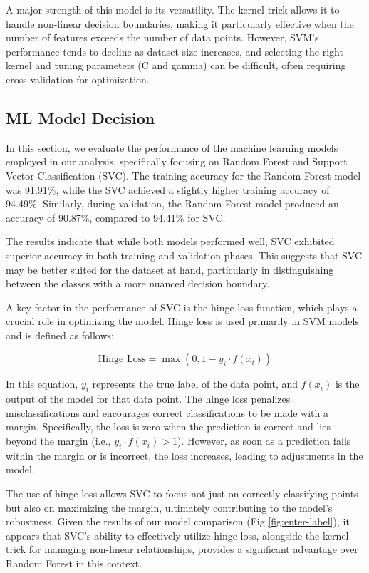 \documentclass{article}
\begin{document}
A major strength of this model is its versatility. The kernel trick allows it to handle non-linear decision boundaries, making it particularly effective when the number of features exceeds the number of data points. However, SVM's performance tends to decline as dataset size increases, and selecting the right kernel and tuning parameters (C and gamma) can be difficult, often requiring cross-validation for optimization.

\subsection{ML Model Decision}

In this section, we evaluate the performance of the machine learning models employed in our analysis, specifically focusing on Random Forest and Support Vector Classification (SVC). The training accuracy for the Random Forest model was 91.91\%, while the SVC achieved a slightly higher training accuracy of 94.49\%. Similarly, during validation, the Random Forest model produced an accuracy of 90.87\%, compared to 94.41\% for SVC. 

The results indicate that while both models performed well, SVC exhibited superior accuracy in both training and validation phases. This suggests that SVC may be better suited for the dataset at hand, particularly in distinguishing between the classes with a more nuanced decision boundary.

A key factor in the performance of SVC is the hinge loss function, which plays a crucial role in optimizing the model. Hinge loss is used primarily in SVM models and is defined as follows\cite{Hinge-loss}:

\[
\text{Hinge Loss} = \max(0, 1 - y_i \cdot f(x_i))
\]


In this equation, \(y_i\) represents the true label of the data point, and \(f(x_i)\) is the output of the model for that data point. The hinge loss penalizes misclassifications and encourages correct classifications to be made with a margin. Specifically, the loss is zero when the prediction is correct and lies beyond the margin (i.e., \(y_i \cdot f(x_i) > 1\)). However, as soon as a prediction falls within the margin or is incorrect, the loss increases, leading to adjustments in the model.\cite{Predicting_Wine_Quality}

The use of hinge loss allows SVC to focus not just on correctly classifying points but also on maximizing the margin, ultimately contributing to the model’s robustness. Given the results of our model comparison (Fig \ref{fig:enter-label}), it appears that SVC's ability to effectively utilize hinge loss, alongside the kernel trick for managing non-linear relationships, provides a significant advantage over Random Forest in this context.
\end{document}
